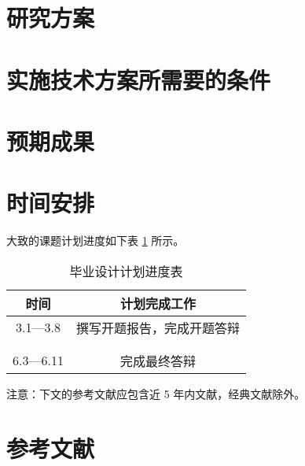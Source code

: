 \documentclass[UTF8,AutoFakeBold,AutoFakeSlant,zihao=-4]{ctexart}
\begin{document}
\section{研究方案}
\subsection{}
\subsection{}

\section{实施技术方案所需要的条件}
\subsection{}
\subsection{}

\section{预期成果}

\section{时间安排}
大致的课题计划进度如下表 \ref{tab:progress} 所示。


\renewcommand*\arraystretch{2.4} 
\begin{table}[!ht]
  \centering
  \caption{毕业设计计划进度表}
  \label{tab:progress}
  \begin{tabular}{@{}cc@{}}
    \toprule
    时间 & 计划完成工作       \\ \midrule
    3.1—3.8 & 撰写开题报告，完成开题答辩 \\\hline
    & \\\hline
    & \\\hline
    6.3—6.11 & 完成最终答辩\\\bottomrule
  \end{tabular}
\end{table}


注意：下文的参考文献应包含近 5 年内文献，经典文献除外。

\section{参考文献}
\printbibliography[heading=none]
\end{document}
